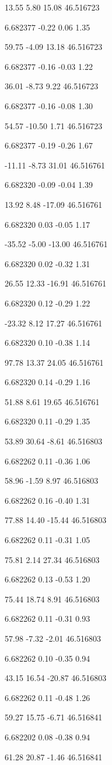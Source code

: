 13.55
5.80
15.08
46.516723

6.682377
-0.22
0.06
1.35

59.75
-4.09
13.18
46.516723

6.682377
-0.16
-0.03
1.22

36.01
-8.73
9.22
46.516723

6.682377
-0.16
-0.08
1.30

54.57
-10.50
1.71
46.516723

6.682377
-0.19
-0.26
1.67

-11.11
-8.73
31.01
46.516761

6.682320
-0.09
-0.04
1.39

13.92
8.48
-17.09
46.516761

6.682320
0.03
-0.05
1.17

-35.52
-5.00
-13.00
46.516761

6.682320
0.02
-0.32
1.31

26.55
12.33
-16.91
46.516761

6.682320
0.12
-0.29
1.22

-23.32
8.12
17.27
46.516761

6.682320
0.10
-0.38
1.14

97.78
13.37
24.05
46.516761

6.682320
0.14
-0.29
1.16

51.88
8.61
19.65
46.516761

6.682320
0.11
-0.29
1.35

53.89
30.64
-8.61
46.516803

6.682262
0.11
-0.36
1.06

58.96
-1.59
8.97
46.516803

6.682262
0.16
-0.40
1.31

77.88
14.40
-15.44
46.516803

6.682262
0.11
-0.31
1.05

75.81
2.14
27.34
46.516803

6.682262
0.13
-0.53
1.20

75.44
18.74
8.91
46.516803

6.682262
0.11
-0.31
0.93

57.98
-7.32
-2.01
46.516803

6.682262
0.10
-0.35
0.94

43.15
16.54
-20.87
46.516803

6.682262
0.11
-0.48
1.26

59.27
15.75
-6.71
46.516841

6.682202
0.08
-0.38
0.94

61.28
20.87
-1.46
46.516841

